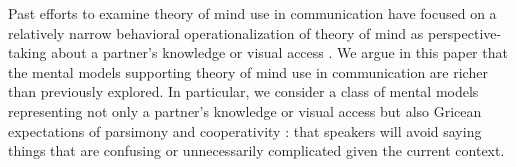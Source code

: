 \documentclass[manuscript]{stjour}
\begin{document}
Past efforts to examine theory of mind use in communication have focused on a relatively narrow behavioral operationalization of theory of mind as perspective-taking about a partner's knowledge or visual access \citep{KeysarBarr___Brauner00_TakingPerspective, KeysarLinBarr03_LimitsOnTheoryOfMindUse, LinKeysarEpley10_ReflexivelyMindblind}. 
We argue in this paper that the mental models supporting theory of mind use in communication are richer than previously explored. 
In particular, we consider a class of mental models representing not only a partner's knowledge or visual access but also Gricean expectations of parsimony and cooperativity \citep{FrankeJager16_ProbabilisticPragmatics, Grice75_LogicConversation,Clark96_UsingLanguage,GoodmanFrank16_RSATiCS, FrankGoodman12_PragmaticReasoningLanguageGames, GoodmanStuhlmuller13_KnowledgeImplicature}: that speakers will avoid saying things that are confusing or unnecessarily complicated given the current context. 

\end{document}

